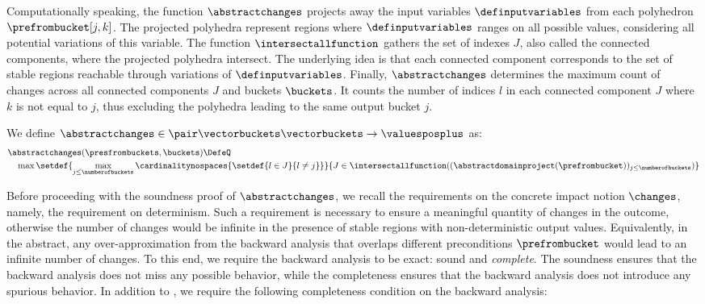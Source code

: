Computationally speaking, the function $\abstractchanges$ projects away the input variables $\definputvariables$ from each polyhedron $\prefrombucket[{j, k}]$.
The projected polyhedra represent regions where $\definputvariables$ ranges on all possible values, considering all potential variations of this variable.
The function $\intersectallfunction$ gathers the set of indexes $J$, also called the connected components, where the projected polyhedra intersect.
The underlying idea is that each connected component corresponds to the set of stable regions reachable through variations of $\definputvariables$.
%
Finally, $\abstractchanges$ determines the maximum count of changes across all connected components $J$ and buckets $\buckets$.
It counts the number of indices $l$ in each connected component $J$ where $k$ is not equal to $j$, thus excluding the polyhedra leading to the same output bucket $j$.

\begin{definition}[$\abstractchanges$]
  We define $\abstractchanges\in\pair\vectorbuckets\vectorbuckets\to\valuesposplus$ as:
  \begin{align*}
    &\abstractchanges(\presfrombuckets, \buckets) \DefeQ \\
      &\quad \max
      \setdef{
        \max_{j \le \numberofbuckets} \cardinalitynospaces{\setdef{l \in J}{l \neq j}}
      }{
        J \in \intersectallfunction((\abstractdomainproject(\prefrombucket))_{j\le\numberofbuckets})
      }
  \end{align*}
\end{definition}

Before proceeding with the soundness proof of $\abstractchanges$, we recall the requirements on the concrete impact notion $\changes$, namely, the requirement on determinism.
Such a requirement is necessary to ensure a meaningful quantity of changes in the outcome, otherwise the number of changes would be infinite in the presence of stable regions with non-deterministic output values.
Equivalently, in the abstract, any over-approximation from the backward analysis that overlaps different preconditions $\prefrombucket$ would lead to an infinite number of changes.
To this end, we require the backward analysis to be exact: sound and \emph{complete}.
The soundness ensures that the backward analysis does not miss any possible behavior, while the completeness ensures that the backward analysis does not introduce any spurious behavior.
In addition to , we require the following completeness condition on the backward analysis:

